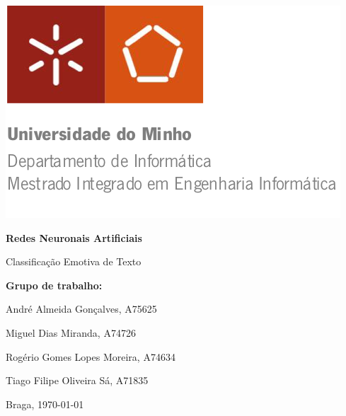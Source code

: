 \begin{titlepage}


\begin{minipage}{0.6\textwidth}
\begin{flushleft} 
\includegraphics[width=\textwidth]{./Imagens/logo.png}
\end{flushleft}
\end{minipage}

\vspace{3cm}

\Huge

\textbf{Redes Neuronais Artificiais}

\LARGE

Classificação Emotiva de Texto 



\vfill

\normalsize

\textbf{Grupo de trabalho:}

André Almeida Gonçalves, A75625

Miguel Dias Miranda, A74726

Rogério Gomes Lopes Moreira, A74634

Tiago Filipe Oliveira Sá, A71835


\vfill

Braga, {\today}

\end{titlepage}

\restoregeometry